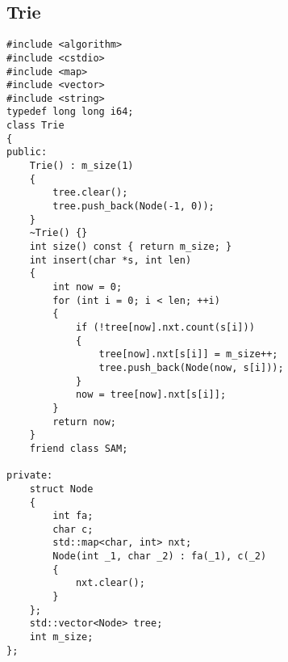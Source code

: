 \documentclass{ctexbook}  %
\begin{document}
\subsection{Trie}
\lstset{basicstyle=	tfamily}
\begin{Verbatim}[fontsize=\small]
#include <algorithm>
#include <cstdio>
#include <map>
#include <vector>
#include <string>
typedef long long i64;
class Trie
{
public:
    Trie() : m_size(1)
    {
        tree.clear();
        tree.push_back(Node(-1, 0));
    }
    ~Trie() {}
    int size() const { return m_size; }
    int insert(char *s, int len)
    {
        int now = 0;
        for (int i = 0; i < len; ++i)
        {
            if (!tree[now].nxt.count(s[i]))
            {
                tree[now].nxt[s[i]] = m_size++;
                tree.push_back(Node(now, s[i]));
            }
            now = tree[now].nxt[s[i]];
        }
        return now;
    }
    friend class SAM;

private:
    struct Node
    {
        int fa;
        char c;
        std::map<char, int> nxt;
        Node(int _1, char _2) : fa(_1), c(_2)
        {
            nxt.clear();
        }
    };
    std::vector<Node> tree;
    int m_size;
};
\end{Verbatim}
\end{document}
